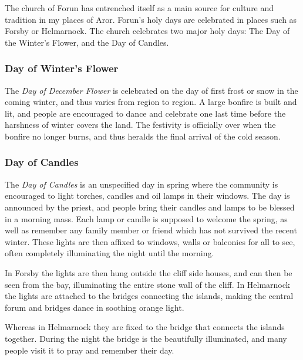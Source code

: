 The church of Forun has entrenched itself as a main source for culture and
tradition in my places of Aror. Forun's holy days are celebrated in places
such as Forsby or Helmarnock. The church celebrates two major holy days: The
Day of the Winter's Flower, and the Day of Candles.

\subsubsection*{Day of Winter's Flower}
\label{sec:Day of Winters Flower}


The \emph{Day of December Flower} is celebrated on the day of first frost or
snow in the coming winter, and thus varies from region to region. A large
bonfire is built and lit, and people are encouraged to dance and celebrate one
last time before the harshness of winter covers the land. The festivity is
officially over when the bonfire no longer burns, and thus heralds the final
arrival of the cold season.

\subsubsection*{Day of Candles}
\label{sec:Day of Candles}

The \emph{Day of Candles} is an unspecified day in spring where the community
is encouraged to light torches, candles and oil lamps in their windows. The
day is announced by the priest, and people bring their candles and lamps to be
blessed in a morning mass. Each lamp or candle is supposed to welcome the
spring, as well as remember any family member or friend which has not survived
the recent winter. These lights are then affixed to windows, walls or balconies
for all to see, often completely illuminating the night until the morning.

In Forsby the lights are then hung outside the cliff side houses, and can
then be seen from the bay, illuminating the entire stone wall of the cliff. In
Helmarnock the lights are attached to the bridges connecting the islands,
making the central forum and bridges dance in soothing orange light.

Whereas in Helmarnock they are fixed to the bridge that connects the islands
together. During the night the bridge is the beautifully illuminated, and many
people visit it to pray and remember their day.


